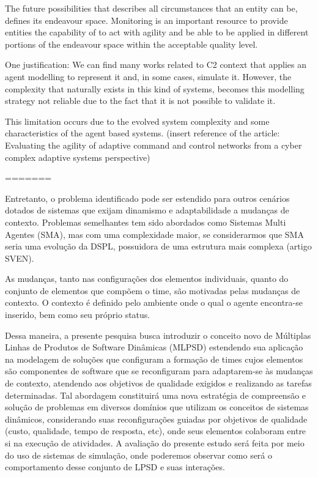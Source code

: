 
The future possibilities that describes all circumstances that an entity can be, defines its endeavour space. Monitoring is an important resource to provide entities the capability of to act with agility and be able to be applied in different portions of the endeavour space within the acceptable quality level. 



One justification: 
We can find many works related to C2 context that applies an agent modelling to represent it and, in some cases, simulate it. However, the complexity that naturally exists in this kind of systems, becomes this modelling strategy not reliable due to the fact that it is not possible to validate it.

This limitation occurs due to the evolved system complexity and some characteristics of the agent based systems. (insert reference of the article: Evaluating the agility of adaptive command and control networks from a cyber complex adaptive systems perspective)


=======


Entretanto, o problema identificado pode ser estendido para outros cenários dotados de sistemas que exijam dinamismo e adaptabilidade a mudanças de contexto. Problemas semelhantes tem sido abordados como Sistemas Multi Agentes (SMA), mas com uma complexidade maior, se considerarmos que SMA seria uma evolução da DSPL, possuidora de uma estrutura mais complexa (artigo SVEN).



As mudanças, tanto nas configurações dos elementos individuais, quanto do conjunto de elementos que compõem o time, são motivadas pelas mudanças de contexto. O contexto é definido pelo ambiente onde o qual o agente encontra-se inserido, bem como seu próprio status. 



Dessa maneira, a presente pesquisa busca introduzir o conceito novo de Múltiplas Linhas de
Produtos de Software Dinâmicas (MLPSD) estendendo sua aplicação na modelagem de soluções
que configuram a formação de times cujos elementos são componentes de software que se
reconfiguram para adaptarem-se às mudanças de contexto, atendendo aos objetivos de qualidade
exigidos e realizando as tarefas determinadas.
Tal abordagem constituirá uma nova estratégia de compreensão e solução de problemas em
diversos domínios que utilizam os conceitos de sistemas dinâmicos, considerando suas
reconfigurações guiadas por objetivos de qualidade (custo, qualidade, tempo de resposta, etc),
onde seus elementos colaboram entre si na execução de atividades. A avaliação do presente
estudo será feita por meio do uso de sistemas de simulação, onde poderemos observar como será
o comportamento desse conjunto de LPSD e suas interações.


